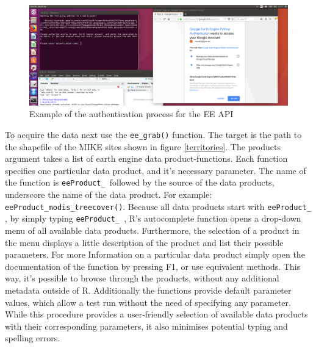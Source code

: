 \begin{center}
	\begin{figure}[h]
		\begin{center}
			\includegraphics[width=15cm]{images/install_authentication.png}
			\caption{Example of the authentication process for the EE API}
			\label{install}
		\end{center}
	\end{figure}
\end{center}


To acquire the data next use the \texttt{ee\_grab()} function. The target is the path to the shapefile of the MIKE sites shown in figure \ref{territories}. The products argument takes a list of earth engine data product-functions. Each function specifies one particular data product, and it's necessary parameter. The name of the function is \texttt{eeProduct\_ }followed by the source of the data products, underscore the name of the data product. For example: \texttt{eeProduct\_modis\_treecover()}. Because all data products start with \texttt{eeProduct\_ }, by simply typing \texttt{eeProduct\_ }, R's autocomplete function opens a drop-down menu of all available data products. Furthermore, the selection of a product in the menu displays a little description of the product and list their possible parameters. For more Information on a particular data product simply open the documentation of the function by pressing F1, or use equivalent methods. This way, it's possible to browse through the products, without any additional metadata outside of R. Additionally the functions provide default parameter values, which allow a test run without the need of specifying any parameter. While this procedure provides a user-friendly selection of available data products with their corresponding parameters, it also minimises potential typing and spelling errors.

